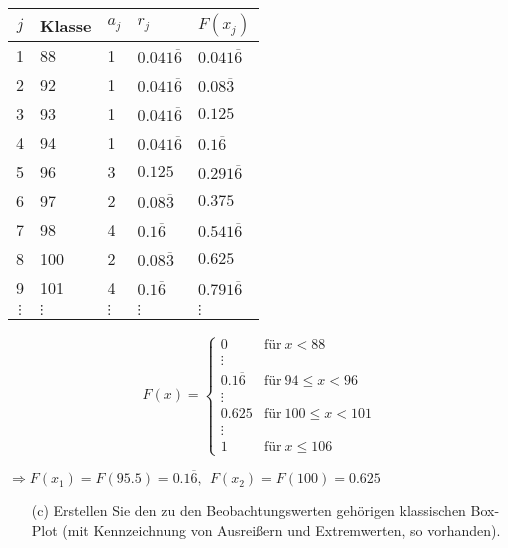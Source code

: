 
\begin{table}[H]
\centering
\begin{tabular}{c|llll}
     $j$      & Klasse   & $a_j$     & $r_j$               & $F(x_j)$ \\ \hline
     1        & 88       & 1         & $0.041\overline{6}$ & $0.041\overline{6}$ \\
     2        & 92       & 1         & $0.041\overline{6}$ & $0.08\overline{3}$  \\
     3        & 93       & 1         & $0.041\overline{6}$ & $0.125$             \\
     4        & 94       & 1         & $0.041\overline{6}$ & $0.1\overline{6}$   \\
     5        & 96       & 3         & $0.125$             & $0.291\overline{6}$ \\
     6        & 97       & 2         & $0.08\overline{3}$  & $0.375$             \\
     7        & 98       & 4         & $0.1\overline{6}$   & $0.541\overline{6}$ \\
     8        & 100      & 2         & $0.08\overline{3}$  & $0.625$             \\
     9        & 101      & 4         & $0.1\overline{6}$   & $0.791\overline{6}$ \\
     $\vdots$ & $\vdots$ & $\vdots$  & $\vdots$            & $\vdots$
\end{tabular}
\end{table}

$$
F(x) = \begin{cases}
    0      & \text{für}~x<88 \\
    \vdots & \\
    0.1\overline{6} & \text{für}~94\le x<96 \\
    \vdots & \\
    0.625  & \text{für}~100\le x<101 \\
    \vdots & \\
    1      & \text{für}~x\le 106
\end{cases}
$$

$\Rightarrow F(x_1) = F(95.5) = 0.1\overline{6},~~F(x_2) = F(100) = 0.625$


\begin{task}
    \begin{enumerate}
        \item[(c)] Erstellen Sie den zu den Beobachtungswerten gehörigen klassischen Box-Plot (mit Kennzeichnung von Ausreißern und Extremwerten, so vorhanden).
    \end{enumerate}
\end{task}
